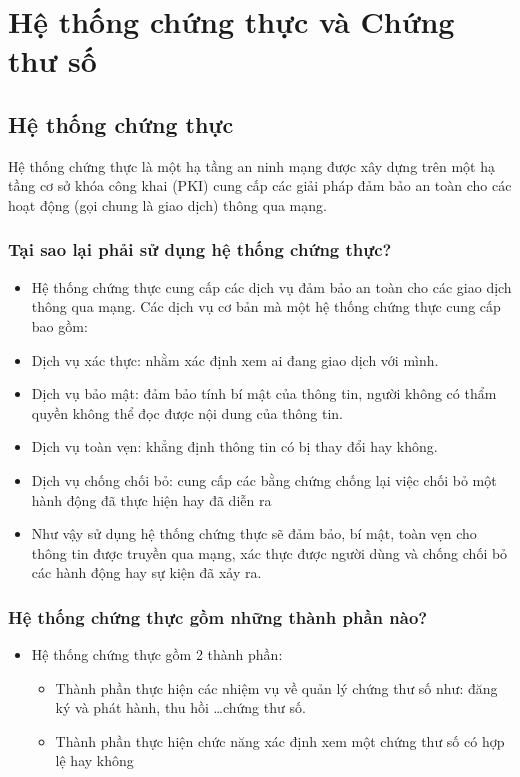 \documentclass[a4paper,12pt]{report}
\begin{document}
\section{Hệ thống chứng thực và Chứng thư số}
\subsection*{Hệ thống chứng thực}
Hệ thống chứng thực là một hạ tầng an ninh mạng được xây dựng trên một hạ tầng cơ sở khóa công khai (PKI) cung cấp các giải pháp đảm bảo an toàn cho các hoạt động (gọi chung là giao dịch) thông qua mạng.
\subsubsection{Tại sao lại phải sử dụng hệ thống chứng thực?}
\begin{itemize}
\item Hệ thống chứng thực cung cấp các dịch vụ đảm bảo an toàn cho các giao dịch thông qua mạng. Các dịch vụ cơ bản mà một hệ thống chứng thực cung cấp bao gồm:
\item Dịch vụ xác thực: nhằm xác định xem ai đang giao dịch với mình.
\item Dịch vụ bảo mật: đảm bảo tính bí mật của thông tin, người không có thẩm quyền không thể đọc được nội dung của thông tin.
\item Dịch vụ toàn vẹn: khẳng định thông tin có bị thay đổi hay không.
\item Dịch vụ chống chối bỏ: cung cấp các bằng chứng chống lại việc chối bỏ một hành động đã thực hiện hay đã diễn ra
\item Như vậy sử dụng hệ thống chứng thực sẽ đảm bảo, bí mật, toàn vẹn cho thông tin được truyền qua mạng, xác thực được người dùng và chống chối bỏ các hành động hay sự kiện đã xảy ra.
\end{itemize}
\subsubsection{Hệ thống chứng thực gồm những thành phần nào?}
\begin{itemize}
\item Hệ thống chứng thực gồm 2 thành phần:
\begin{itemize}
\item Thành phần thực hiện các nhiệm vụ về quản lý chứng thư số như: đăng ký và phát hành, thu hồi \ldots chứng thư số.
\item Thành phần thực hiện chức năng xác định xem một chứng thư số có hợp lệ hay không
\end{itemize}
\end{itemize}
\end{document}
